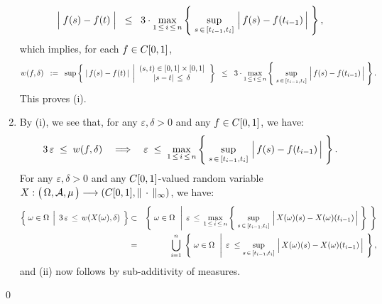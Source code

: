 \begin{enumerate}
		\begin{equation*}
		\left\vert\;f(s)\overset{{\color{white}.}}{-}f(t)\;\right\vert
		\;\;\leq\;\;
			3\cdot\underset{1\,\leq\,i\,\leq\,n}{\max}\left\{\;
				\sup_{s\,\in\,[t_{i-1},t_{i}]}\,\left\vert\,\overset{{\color{white}.}}{f}(s) - f(t_{i-1})\,\right\vert
			\;\right\},
		\end{equation*}
		which implies, for each $f \in C[0,1]$,
		\begin{equation*}
		w(f,\delta)
		\;\;:=\;\;
		\sup\left\{\;
			\left\vert\,f(s) - f(t)\,\right\vert
			\;\left\vert
			\begin{array}{c} (s,t) \in [0,1] \times [0,1] \\ \vert s - t \vert\,\leq\,\delta \end{array}
			\right.
		\right\}
		\;\;\leq\;\;
			3\cdot\underset{1\,\leq\,i\,\leq\,n}{\max}\left\{\;
				\sup_{s\,\in\,[t_{i-1},t_{i}]}\,\left\vert\,\overset{{\color{white}.}}{f}(s) - f(t_{i-1})\,\right\vert
			\;\right\}.
		\end{equation*}
		This proves (i).
\item	By (i), we see that, for any $\varepsilon, \delta > 0$ and any $f \in C[0,1]$, we have:
		\begin{equation*}
		3\,\varepsilon \;\leq\; w(f,\delta) 
		\quad\Longrightarrow\quad
		\varepsilon
		\;\leq\;
		\underset{1\,\leq\,i\,\leq\,n}{\max}\left\{\;
			\sup_{s\,\in\,[t_{i-1},t_{i}]}\,\left\vert\,\overset{{\color{white}.}}{f}(s) - f(t_{i-1})\,\right\vert
		\;\right\}.
		\end{equation*}
		For any $\varepsilon, \delta > 0$ and any $C[0,1]$-valued random variable
		$X : \left(\,\Omega,\mathcal{A},\overset{{\color{white}.}}{\mu}\,\right) \longrightarrow \left(\Czo,\Vert\,\cdot\,\Vert_{\infty}\right)$,
		we have:
		\begin{eqnarray*}
		\left\{\;
			\omega \in \Omega
			\;\left\vert\;\,
			3\,\varepsilon\,\overset{{\color{white}.}}{\leq}\,w(X(\omega),\delta)
			\right.
		\;\right\}
		&\subset&
		\left\{\;
			\omega \in \Omega
			\,\;\left\vert\;\,
			\varepsilon\,\overset{{\color{white}.}}{\leq}\,
			\underset{1\,\leq\,i\,\leq\,n}{\max}\left\{\;
				\sup_{s\,\in\,[t_{i-1},t_{i}]}\,\left\vert\,\overset{{\color{white}.}}{X}(\omega)(s) - X(\omega)(t_{i-1})\,\right\vert
			\;\right\}
			\right.
		\;\right\}
		\\
		&=&
		\overset{n}{\underset{i=1}{\bigcup}}\;
		\left\{\;
			\omega \in \Omega
			\,\;\left\vert\;\,
			\varepsilon\;\overset{{\color{white}.}}{\leq}
				\sup_{s\,\in\,[t_{i-1},t_{i}]}\,\left\vert\,\overset{{\color{white}.}}{X}(\omega)(s) - X(\omega)(t_{i-1})\,\right\vert
			\right.
		\;\right\},
		\end{eqnarray*}
		and (ii) now follows by sub-additivity of measures.
\end{enumerate}
\qed

